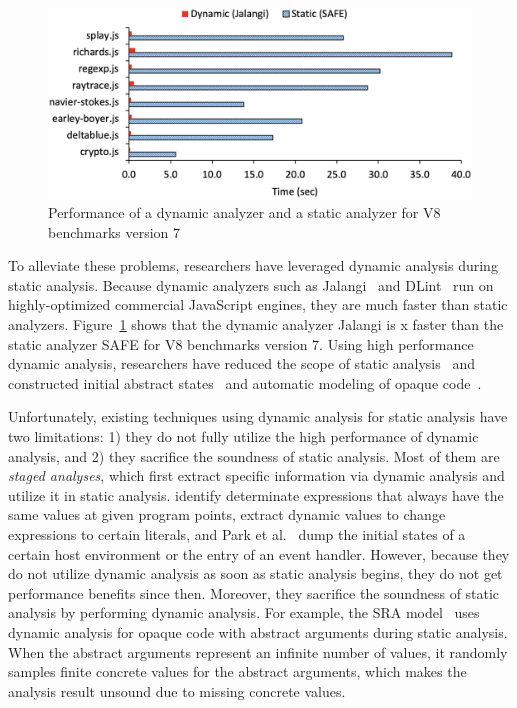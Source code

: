 \begin{figure}[t]
  \centering
  \includegraphics[width=\linewidth]{img/performance_v8v7}
  \vspace*{-2em}
  \caption{Performance of a dynamic analyzer and a static analyzer for V8
  benchmarks version 7}
  \label{fig:performance}
  \vspace*{-1em}
\end{figure}

To alleviate these problems, researchers have leveraged
dynamic analysis during static analysis.  Because dynamic
analyzers such as Jalangi~\cite{jalangi} and DLint~\cite{dlint} run on
highly-optimized commercial JavaScript engines, they are much faster than
static analyzers.  Figure~\ref{fig:performance} shows that the dynamic analyzer
Jalangi is x faster than the static analyzer SAFE for V8 benchmarks
version 7.  Using high performance dynamic analysis, researchers have
reduced the scope of static analysis~\cite{determinacy, blendedJS} and constructed
initial abstract states~\cite{battles, eha} and automatic modeling of opaque
code~\cite{sra}.

Unfortunately, existing techniques using dynamic analysis for static analysis
have two limitations: 1) they do not fully utilize the high performance of dynamic
analysis, and 2) they sacrifice the soundness of static analysis.  Most of
them are \textit{staged analyses}, which first extract specific
information via dynamic analysis and utilize it in static analysis.
\citet{determinacy} identify determinate expressions that always have the same
values at given program points, \citet{blendedJS} extract dynamic values to
change expressions to certain literals, and Park et al.~\cite{battles,eha} dump
the initial states of a certain host environment or the entry of an event handler.
However, because they do not utilize dynamic analysis as soon as static
analysis begins, they do not get performance benefits since then.  Moreover,
they sacrifice the soundness of static analysis by performing dynamic analysis.
For example, the SRA model~\cite{sra} uses dynamic analysis for opaque code
with abstract arguments during static analysis.  When the abstract arguments
represent an infinite number of values, it randomly samples finite
concrete values for the abstract arguments, which makes the analysis
result unsound due to missing concrete values.

